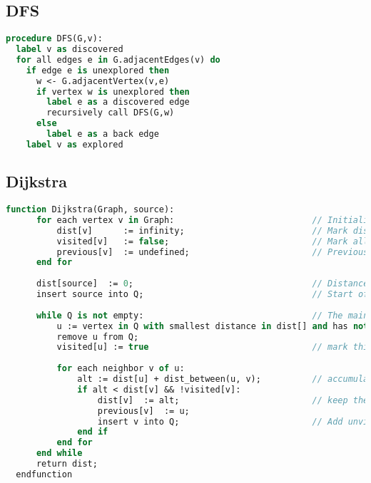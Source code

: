 \documentclass[10pt,a4paper]{article}
\begin{document}
\subsection*{DFS}
\begin{lstlisting}[language=Pascal]
procedure DFS(G,v):
  label v as discovered
  for all edges e in G.adjacentEdges(v) do
    if edge e is unexplored then
      w <- G.adjacentVertex(v,e)
      if vertex w is unexplored then
        label e as a discovered edge
        recursively call DFS(G,w)
      else
        label e as a back edge
    label v as explored
\end{lstlisting}

\subsection*{Dijkstra}
\begin{lstlisting}[language=Pascal]
  function Dijkstra(Graph, source):
      for each vertex v in Graph:                           // Initializations
          dist[v]      := infinity;                         // Mark distances from source to v as not yet computed
          visited[v]   := false;                            // Mark all nodes as unvisited
          previous[v]  := undefined;                        // Previous node in optimal path from source
      end for
      
      dist[source]  := 0;                                   // Distance from source to itself is zero
      insert source into Q;                                 // Start off with the source node
                                                                
      while Q is not empty:                                 // The main loop
          u := vertex in Q with smallest distance in dist[] and has not been visited;  // Source node in first case
          remove u from Q;
          visited[u] := true                                // mark this node as visited
          
          for each neighbor v of u:   
              alt := dist[u] + dist_between(u, v);          // accumulate shortest dist from source
              if alt < dist[v] && !visited[v]:                                 
                  dist[v]  := alt;                          // keep the shortest dist from src to v
                  previous[v]  := u;
                  insert v into Q;                          // Add unvisited v into the Q to be processed
              end if
          end for
      end while
      return dist;
  endfunction
\end{lstlisting}
\end{document}
